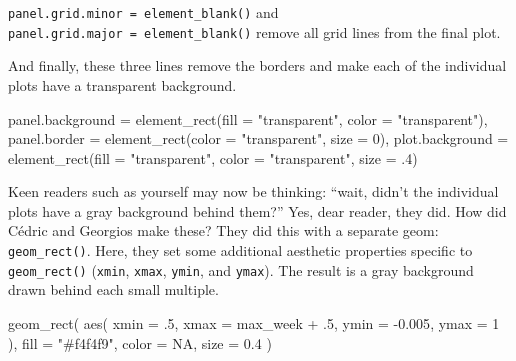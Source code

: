 \documentclass[
]{book}
\newenvironment{Shaded}{\begin{snugshade}}{\end{snugshade}}
\newcommand{\AttributeTok}[1]{\textcolor[rgb]{0.77,0.63,0.00}{#1}}
\newcommand{\ConstantTok}[1]{\textcolor[rgb]{0.00,0.00,0.00}{#1}}
\newcommand{\DecValTok}[1]{\textcolor[rgb]{0.00,0.00,0.81}{#1}}
\newcommand{\FloatTok}[1]{\textcolor[rgb]{0.00,0.00,0.81}{#1}}
\newcommand{\FunctionTok}[1]{\textcolor[rgb]{0.00,0.00,0.00}{#1}}
\newcommand{\NormalTok}[1]{#1}
\newcommand{\OtherTok}[1]{\textcolor[rgb]{0.56,0.35,0.01}{#1}}
\newcommand{\SpecialCharTok}[1]{\textcolor[rgb]{0.00,0.00,0.00}{#1}}
\newcommand{\StringTok}[1]{\textcolor[rgb]{0.31,0.60,0.02}{#1}}
\begin{document}
\texttt{panel.grid.minor\ =\ element\_blank()} and \texttt{panel.grid.major\ =\ element\_blank()} remove all grid lines from the final plot.

And finally, these three lines remove the borders and make each of the individual plots have a transparent background.

\begin{Shaded}
\begin{Highlighting}[]
\NormalTok{panel.background }\OtherTok{=} \FunctionTok{element\_rect}\NormalTok{(}\AttributeTok{fill =} \StringTok{"transparent"}\NormalTok{, }\AttributeTok{color =} \StringTok{"transparent"}\NormalTok{),}
\NormalTok{panel.border }\OtherTok{=} \FunctionTok{element\_rect}\NormalTok{(}\AttributeTok{color =} \StringTok{"transparent"}\NormalTok{, }\AttributeTok{size =} \DecValTok{0}\NormalTok{),}
\NormalTok{plot.background }\OtherTok{=} \FunctionTok{element\_rect}\NormalTok{(}\AttributeTok{fill =} \StringTok{"transparent"}\NormalTok{, }\AttributeTok{color =} \StringTok{"transparent"}\NormalTok{, }\AttributeTok{size =}\NormalTok{ .}\DecValTok{4}\NormalTok{)}
\end{Highlighting}
\end{Shaded}

Keen readers such as yourself may now be thinking: ``wait, didn't the individual plots have a gray background behind them?'' Yes, dear reader, they did. How did Cédric and Georgios make these? They did this with a separate geom: \texttt{geom\_rect()}. Here, they set some additional aesthetic properties specific to \texttt{geom\_rect()} (\texttt{xmin}, \texttt{xmax}, \texttt{ymin}, and \texttt{ymax}). The result is a gray background drawn behind each small multiple.

\begin{Shaded}
\begin{Highlighting}[]
\FunctionTok{geom\_rect}\NormalTok{(}
  \FunctionTok{aes}\NormalTok{(}
    \AttributeTok{xmin =}\NormalTok{ .}\DecValTok{5}\NormalTok{,}
    \AttributeTok{xmax =}\NormalTok{ max\_week }\SpecialCharTok{+}\NormalTok{ .}\DecValTok{5}\NormalTok{,}
    \AttributeTok{ymin =} \SpecialCharTok{{-}}\FloatTok{0.005}\NormalTok{,}
    \AttributeTok{ymax =} \DecValTok{1}
\NormalTok{  ),}
  \AttributeTok{fill =} \StringTok{"\#f4f4f9"}\NormalTok{,}
  \AttributeTok{color =} \ConstantTok{NA}\NormalTok{,}
  \AttributeTok{size =} \FloatTok{0.4}
\NormalTok{)}
\end{Highlighting}
\end{Shaded}
\end{document}
